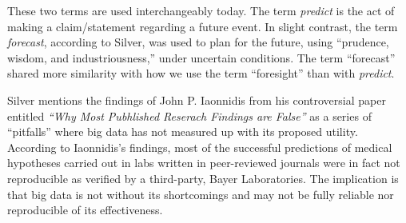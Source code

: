 \documentclass[12pt]{article}
\begin{document}

\begin{enumerate}


\begin{tcolorbox}[colback=white, sharp corners]

These two terms are used interchangeably today. The term \emph{predict} is the act of making a claim/statement regarding a future event. In slight contrast, the term \emph{forecast}, according to Silver, was used to plan for the future, using ``prudence, wisdom, and industriousness,'' under uncertain conditions. The term ``forecast'' shared more similarity with how we use the term ``foresight'' than with \emph{predict}.


\end{tcolorbox}


\begin{tcolorbox}[colback=white, sharp corners]

Silver mentions the findings of John P. Iaonnidis from his controversial paper entitled \emph{``Why Most Pubhlished Reserach Findings are False''} as a series of ``pitfalls'' where big data has not measured up with its proposed utility. According to Iaonnidis's findings, most of the successful predictions of medical hypotheses carried out in labs written in peer-reviewed journals were in fact not reproducible as verified by a third-party, Bayer Laboratories. The implication is that big data is not without its shortcomings and may not be fully reliable nor reproducible of its effectiveness. 

\end{tcolorbox}



\end{enumerate}
\end{document}
